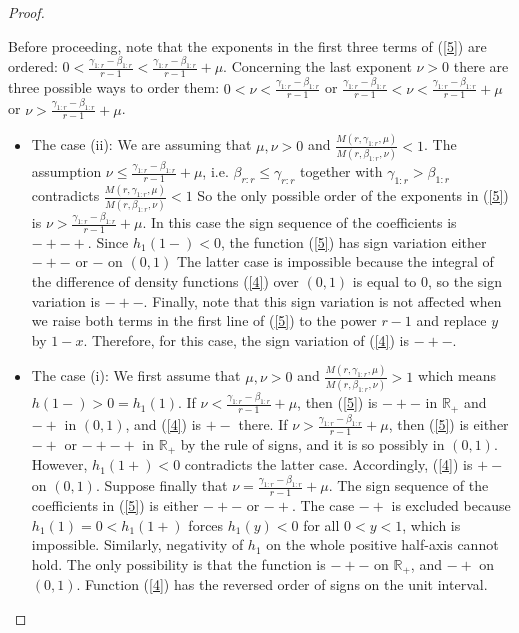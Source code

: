 \documentclass [11pt]{article}
\begin{document}
\begin{proof}
\begin{enumerate}
Before proceeding, note that the exponents in the first three terms of (\ref{5}) are ordered: $0< \frac{\gamma_{1:r}-\beta_{1:r}}{r-1} < \frac{\gamma_{1:r}-\beta_{1:r}}{r-1}+\mu$. Concerning the last exponent $\nu>0$ there are three possible ways to order them:  $0 < \nu < \frac{\gamma_{1:r}-\beta_{1:r}}{r-1}$ or $\frac{\gamma_{1:r}-\beta_{1:r}}{r-1} < \nu <\frac{\gamma_{1:r}-\beta_{1:r}}{r-1} +\mu $ or $\nu > \frac{\gamma_{1:r}-\beta_{1:r}}{r-1} +\mu$.
    \begin{itemize}
   \item
   The case (ii): %
   We are assuming that $\mu, \nu >0$ and $\frac{M(r,\gamma_{1:r},\mu)}{M(r,\beta_{1:r},\nu)}<1$.
    The assumption $\nu \leq \frac{\gamma_{1:r}-\beta_{1:r}}{r-1}+\mu$, i.e. $\beta_{r:r} \leq \gamma_{r:r}$ together with $\gamma_{1:r} > \beta_{1:r}$ contradicts $\frac{M(r,\gamma_{1:r},\mu)}{M(r,\beta_{1:r},\nu)}<1$
    So the only possible order of the exponents in (\ref{5}) is $\nu > \frac{\gamma_{1:r}-\beta_{1:r}}{r-1} +\mu$. 
    In this case the sign sequence of the coefficients is $-+-+$. Since $h_1(1-)<0$, the function (\ref{5}) has sign variation either $-+-$ or $-$ on $(0,1)$ 
    The latter case is impossible because the integral of the difference of density functions (\ref{4}) over $(0,1)$ is equal to $0$, so the sign variation is $-+-$. Finally, note that this sign variation is not affected when we raise both terms in the first line of (\ref{5}) to the power $r-1$ and replace $y$ by $1-x$. Therefore, for this case, the sign variation of (\ref{4}) is $-+-$. 
    \item
    The case (i): %
    We first assume that  $\mu,\nu >0$ and $\frac{M(r,\gamma_{1:r},\mu)}{M(r,\beta_{1:r},\nu)}>1$
    which means $h(1-)>0=h_1(1)$.
    If $\nu <  \frac{\gamma_{1:r}-\beta_{1:r}}{r-1} +\mu$, then (\ref{5}) is 
    $-+-$ in $\mathbb{R}_+$ and $-+$ in $(0,1)$,  and (\ref{4}) is $+-$ there.
    If $\nu >  \frac{\gamma_{1:r}-\beta_{1:r}}{r-1} +\mu$, then (\ref{5}) is either 
    $-+$ or $-+-+$ in $\mathbb{R}_+$ by the rule of signs, and it is so possibly in $(0,1)$. 
    However, $h_1(1+)<0$ contradicts the latter 
    case. 
    Accordingly, (\ref{4}) is $+-$ on $(0,1)$.
    Suppose finally that $\nu =  \frac{\gamma_{1:r}-\beta_{1:r}}{r-1} +\mu$. The sign sequence of the coefficients in (\ref{5}) is either $-+-$ or $-+$.  
    The case $-+$ is excluded because $h_1(1)= 0 < h_1(1+)$ forces $h_1(y)<0$ for all $0<y<1$, which is impossible. 
    Similarly, negativity of $h_1$ on the whole 
    positive half-axis cannot hold. The only possibility is that 
    the function is $-+-$ on $\mathbb{R}_+$, and $-+$ on $(0,1)$. Function (\ref{4}) has the reversed order of signs on the unit interval.   
    

\end{itemize}
\end{enumerate}
\end{proof}
\end{document}
